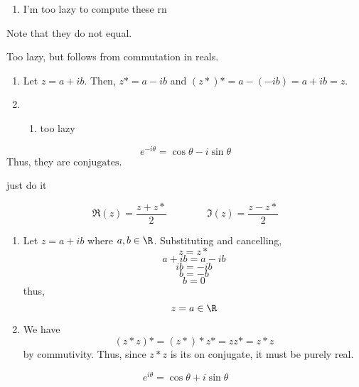 \begin{Solution}{1}
	\begin{multicols}{3}
	\begin{enumerate}[label = (\alph*)]
		\item I'm too lazy to compute these rn
	\end{enumerate}
	\end{multicols}
	Note that they do not equal.
\end{Solution}
\begin{Solution}{2}
	Too lazy, but follows from commutation in reals.
\end{Solution}
\begin{Solution}{3}
	\begin{enumerate}[label = (\alph*)]
		\item Let \(z=a+ib\). Then, \(z\ast = a-ib\) and \((z\ast)\ast = a-(-ib) = a+ib = z\).
		\item \begin{enumerate}[label = (\roman*)]
			\item too lazy
		\end{enumerate}
	\end{enumerate}
\end{Solution}
\begin{Solution}{4}
	\[e^{-i\theta} = \boxed{\cos\theta-i\sin\theta}\]
	Thus, they are \(\boxed{\text{conjugates}}\).
\end{Solution}
\begin{Solution}{5}
		just do it
	
\end{Solution}
\begin{Solution}{6}
	\[\Re(z) = \frac{z+z\ast}{2}\qquad\qquad \Im(z) = \frac{z-z\ast}{2}\]
\end{Solution}
\begin{Solution}{7}
	\begin{enumerate}[label = (\alph*)]
		\item Let \(z = a+ib\) where \(a,b\in\R\). Substituting and cancelling,
			\[z=z\ast\]
			\[a+ib = a-ib\]
			\[ib = -ib\]
			\[b = -b\]
			\[b=0\]
			thus,
			\[z = a\in\R\]
		\item We have
			\[(z\ast z)\ast = (z\ast)\ast z\ast = zz\ast = z\ast z\]
			by commutivity. Thus, since \(z\ast z\) is its on conjugate, it must be purely real.
	\end{enumerate}
\end{Solution}
\begin{Solution}{8}
	\[e^{i\theta} = \cos\theta + i\sin\theta\]
\end{Solution}
